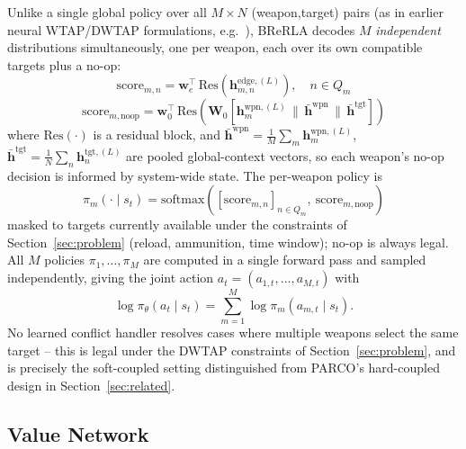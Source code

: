 \documentclass{ieeeaccess}
\begin{document}
Unlike a single global policy over all $M \times N$ (weapon,target) pairs (as in earlier neural WTAP/DWTAP formulations, e.g.~\cite{na2023weapon}), BReRLA decodes $M$ \emph{independent} distributions simultaneously, one per weapon, each over its own compatible targets plus a no-op:
\begin{equation}
\text{score}_{m,n} = \bm{w}_e^\top \, \text{Res}\!\left(\bm{h}_{m,n}^{\text{edge},(L)}\right), \quad n \in Q_m
\end{equation}
\begin{equation}
\text{score}_{m,\text{noop}} = \bm{w}_0^\top \, \text{Res}\!\left(\bm{W}_0\left[\bm{h}_m^{\text{wpn},(L)} \,\|\, \bar{\bm{h}}^{\text{wpn}} \,\|\, \bar{\bm{h}}^{\text{tgt}}\right]\right)
\end{equation}
where $\text{Res}(\cdot)$ is a residual block, and $\bar{\bm{h}}^{\text{wpn}} = \frac{1}{M}\sum_m \bm{h}_m^{\text{wpn},(L)}$, $\bar{\bm{h}}^{\text{tgt}} = \frac{1}{N}\sum_n \bm{h}_n^{\text{tgt},(L)}$ are pooled global-context vectors, so each weapon's no-op decision is informed by system-wide state. The per-weapon policy is
\begin{equation}
\label{eq:parallel-policy}
\pi_m(\cdot \mid s_t) = \text{softmax}\!\left(\left[\text{score}_{m,n}\right]_{n \in Q_m},\ \text{score}_{m,\text{noop}}\right)
\end{equation}
masked to targets currently available under the constraints of Section~\ref{sec:problem} (reload, ammunition, time window); no-op is always legal. All $M$ policies $\pi_1, \ldots, \pi_M$ are computed in a single forward pass and sampled independently, giving the joint action $a_t = (a_{1,t}, \ldots, a_{M,t})$ with
\begin{equation}
\log \pi_\theta(a_t \mid s_t) = \sum_{m=1}^{M} \log \pi_m(a_{m,t} \mid s_t).
\end{equation}
No learned conflict handler resolves cases where multiple weapons select the same target -- this is legal under the DWTAP constraints of Section~\ref{sec:problem}, and is precisely the soft-coupled setting distinguished from PARCO's hard-coupled design in Section~\ref{sec:related}.

\subsection{Value Network}
\end{document}
